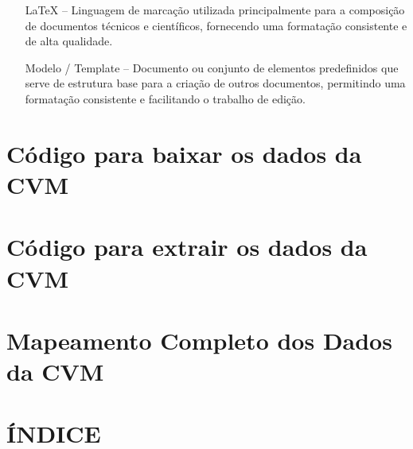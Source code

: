 \documentclass[recuosum=1.5cm]{iftex2024}
\begin{document}
\begin{itemize}[]
\item[LaTeX] -- Linguagem de marcação utilizada principalmente para a composição de documentos técnicos e científicos, fornecendo uma formatação consistente e de alta qualidade.
\item[Modelo / Template] -- Documento ou conjunto de elementos predefinidos que serve de estrutura base para a criação de outros documentos, permitindo uma formatação consistente e facilitando o trabalho de edição.
\end{itemize}

%	
%
%
%
%
%
%


\appendix
\renewcommand{\chaptername}{Apêndice}

\chapter{Código para baixar os dados da CVM}
\label{ap:codigo-baixar}


\chapter{Código para extrair os dados da CVM}
\label{ap:codigo-extrair}


\chapter{Mapeamento Completo dos Dados da CVM}
\label{ap:mapeamento-cvm-dfp}



\chapter*{ÍNDICE}

\printindex
\end{document}
